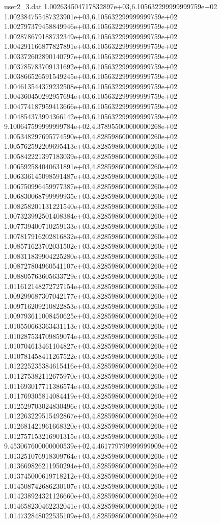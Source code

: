 \begin{filecontents}{user2_3.dat}
1.002634504717832897e+03,6.105632299999999759e+02
1.002384755487323901e+03,6.105632299999999759e+02
1.002797379458849946e+03,6.105632299999999759e+02
1.002878679188732349e+03,6.105632299999999759e+02
1.004291166877827891e+03,6.105632299999999759e+02
1.003372602890140797e+03,6.105632299999999759e+02
1.003785783709131692e+03,6.105632299999999759e+02
1.003866526591549245e+03,6.105632299999999759e+02
1.004613544379232508e+03,6.105632299999999759e+02
1.004360450292957694e+03,6.105632299999999759e+02
1.004774187959413666e+03,6.105632299999999759e+02
1.004854373994366142e+03,6.105632299999999759e+02
9.100647599999999784e+02,4.378955000000000268e+02
1.005348297695774590e+03,4.828598600000000260e+02
1.005762592209695413e+03,4.828598600000000260e+02
1.005842221397183039e+03,4.828598600000000260e+02
1.006592584040631891e+03,4.828598600000000260e+02
1.006336145098591487e+03,4.828598600000000260e+02
1.006750996459977387e+03,4.828598600000000260e+02
1.006830068799999935e+03,4.828598600000000260e+02
1.008258201131221540e+03,4.828598600000000260e+02
1.007323992501408384e+03,4.828598600000000260e+02
1.007739400710259133e+03,4.828598600000000260e+02
1.007817916202816832e+03,4.828598600000000260e+02
1.008571623702031502e+03,4.828598600000000260e+02
1.008311839904225280e+03,4.828598600000000260e+02
1.008727804960541107e+03,4.828598600000000260e+02
1.008805763605633729e+03,4.828598600000000260e+02
1.011612148272727154e+03,4.828598600000000260e+02
1.009299687307042177e+03,4.828598600000000260e+02
1.009716209210822853e+03,4.828598600000000260e+02
1.009793611008450625e+03,4.828598600000000260e+02
1.010550663363431113e+03,4.828598600000000260e+02
1.010287534709859074e+03,4.828598600000000260e+02
1.010704613461104827e+03,4.828598600000000260e+02
1.010781458411267522e+03,4.828598600000000260e+02
1.012225235384615416e+03,4.828598600000000260e+02
1.011275382112675970e+03,4.828598600000000260e+02
1.011693017711386574e+03,4.828598600000000260e+02
1.011769305814084419e+03,4.828598600000000260e+02
1.012529703024830496e+03,4.828598600000000260e+02
1.012263229515492867e+03,4.828598600000000260e+02
1.012681421961668320e+03,4.828598600000000260e+02
1.012757153216901315e+03,4.828598600000000260e+02
9.453067600000000539e+02,4.461779799999999909e+02
1.013251076918309764e+03,4.828598600000000260e+02
1.013669826211950294e+03,4.828598600000000260e+02
1.013745000619718212e+03,4.828598600000000260e+02
1.014508742686230107e+03,4.828598600000000260e+02
1.014238924321126660e+03,4.828598600000000260e+02
1.014658230462232041e+03,4.828598600000000260e+02
1.014732848022535109e+03,4.828598600000000260e+02

\end{filecontents}
